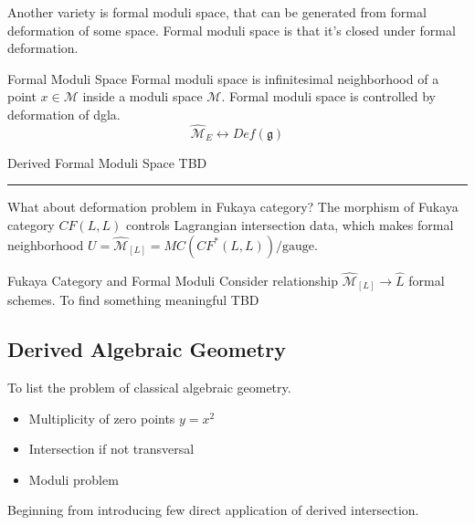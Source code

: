 \documentclass{article}
\begin{document}
\noindent
Another variety is formal moduli space, that can be generated from formal deformation of some space.
Formal moduli space is that it's closed under formal deformation.


\begin{definition}{Formal Moduli Space}{}
Formal moduli space is infinitesimal neighborhood of a point $x\in\mathcal{M}$ inside a moduli space $\mathcal{M}$.
Formal moduli space is controlled by deformation of dgla.\\

\[ \hat{\mathcal{M}}_E \leftrightarrow Def(\mathfrak{g}) \]
\end{definition}


\begin{definition}{Derived Formal Moduli Space}{}
TBD
\end{definition}


\vspace{0.5cm}
\noindent\rule{\textwidth}{0.4pt}
\vspace{0.5cm}


\noindent
What about deformation problem in Fukaya category?
The morphism of Fukaya category $CF(L,L)$ controls Lagrangian intersection data, 
which makes formal neighborhood $U = \hat{\mathcal{M}}_{[L]} = MC(CF^*(L,L))/\text{gauge}$.


\begin{question}{Fukaya Category and Formal Moduli}{}
Consider relationship $\hat{\mathcal{M}}_{[L]} \to \hat{L}$ formal schemes. To find something meaningful TBD
\end{question}








\subsection{Derived Algebraic Geometry}

To list the problem of classical algebraic geometry. \\

\begin{itemize}
\item Multiplicity of zero points $y=x^2$
\item Intersection if not transversal
\item Moduli problem
\end{itemize}

\noindent
Beginning from introducing few direct application of derived intersection. 
\end{document}
